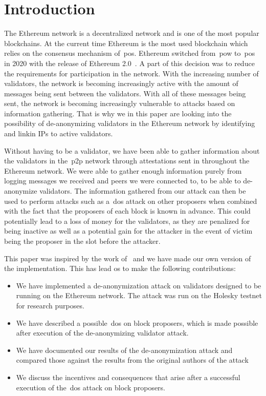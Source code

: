 

\section{Introduction}\label{sec:introduction}
The Ethereum network is a decentralized network and is one of the most popular blockchains.
At the current time Ethereum is the most used blockchain which relies on the consensus mechanism of~\gls{pos}.
Ethereum switched from~\gls{pow} to~\gls{pos} in 2020 with the release of Ethereum 2.0~\cite{EthereumProof-of-stakePoS}.
A part of this decision was to reduce the requirements for participation in the network.
With the increasing number of validators, the network is becoming increasingly active with the amount of messages being sent between the validators.
With all of these messages being sent, the network is becoming increasingly vulnerable to attacks based on information gathering.
That is why we in this paper are looking into the possibility of de-anonymizing validators in the Ethereum network by identifying and linkin IPs to active validators.


Without having to be a validator, we have been able to gather information about the validators in the~\gls{p2p} network through attestations sent in throughout the Ethereum network.
We were able to gather enough information purely from logging messages we received and peers we were connected to, to be able to de-anonymize validators.
The information gathered from our attack can then be used to perform attacks such as a~\gls{dos} attack on other proposers when combined with the fact that the proposers of each block is known in advance.
This could potentially lead to a loss of money for the validators, as they are penalized for being inactive as well as a potential gain for the attacker in the event of victim being the proposer in the slot before the attacker.

This paper was inspired by the work of~\cite{heimbach2024deanonymizingethereumvalidatorsp2p} and we have made our own version of the implementation.
This has lead os to make the following contributions:
\begin{itemize}
    \item We have implemented a de-anonymization attack on validators designed to be running on the Ethereum network.
    The attack was run on the Holesky testnet for research purposes.
    \item We have described a possible~\gls{dos} on block proposers, which is made possible after execution of the de-anonymizing validator attack.
    \item We have documented our results of the de-anonymization attack and compared those against the results from the original authors of the attack~\cite{heimbach2024deanonymizingethereumvalidatorsp2p}
    \item We discuss the incentives and consequences that arise after a successful execution of the~\gls{dos} attack on block proposers.
\end{itemize}

